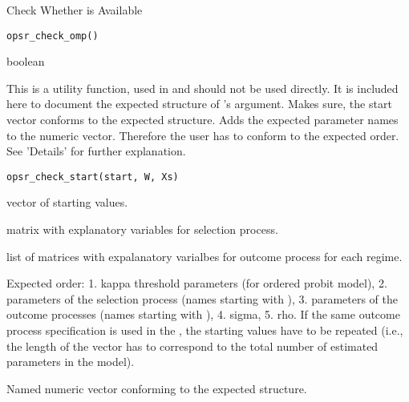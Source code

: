 
%
\begin{Description}
Check Whether  is Available
\end{Description}
%
\begin{Usage}
\begin{verbatim}
opsr_check_omp()
\end{verbatim}
\end{Usage}
%
\begin{Value}
boolean
\end{Value}


%
\begin{Description}
This is a utility function, used in  and should not be used directly.
It is included here to document the expected structure of 's  argument.
Makes sure, the start vector conforms to the expected structure. Adds the
expected parameter names to the numeric vector. Therefore the user has to
conform to the expected order. See 'Details' for further explanation.
\end{Description}
%
\begin{Usage}
\begin{verbatim}
opsr_check_start(start, W, Xs)
\end{verbatim}
\end{Usage}
%
\begin{Arguments}
\begin{ldescription}
\item[\code{start}] vector of starting values.

\item[\code{W}] matrix with explanatory variables for selection process.

\item[\code{Xs}] list of matrices with expalanatory varialbes for outcome process for each regime.
\end{ldescription}
\end{Arguments}
%
\begin{Details}
Expected order: 1. kappa threshold parameters (for ordered probit model),
2. parameters of the selection process (names starting with ), 3. parameters
of the outcome processes (names starting with ), 4. sigma, 5. rho.
If the same outcome process specification is used in the , the starting
values have to be repeated (i.e., the length of the  vector has to
correspond to the total number of estimated parameters in the model).
\end{Details}
%
\begin{Value}
Named numeric vector conforming to the expected structure.
\end{Value}
%
\begin{SeeAlso}
\end{SeeAlso}

